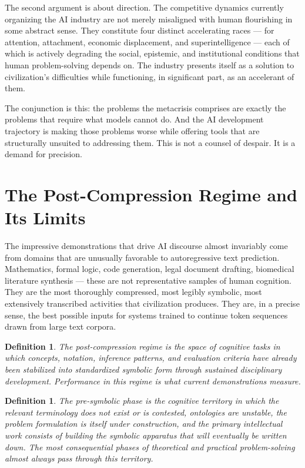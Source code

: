 \documentclass[12pt, a4paper]{article}
\newtheorem{definition}[theorem]{Definition}
\theoremstyle{remark}
\begin{document}
The second argument is about direction. The competitive dynamics currently organizing the AI industry are not merely misaligned with human flourishing in some abstract sense. They constitute four distinct accelerating races --- for attention, attachment, economic displacement, and superintelligence --- each of which is actively degrading the social, epistemic, and institutional conditions that human problem-solving depends on. The industry presents itself as a solution to civilization's difficulties while functioning, in significant part, as an accelerant of them.

The conjunction is this: the problems the metacrisis comprises are exactly the problems that require what models cannot do. And the AI development trajectory is making those problems worse while offering tools that are structurally unsuited to addressing them. This is not a counsel of despair. It is a demand for precision.

\section{The Post-Compression Regime and Its Limits}

The impressive demonstrations that drive AI discourse almost invariably come from domains that are unusually favorable to autoregressive text prediction. Mathematics, formal logic, code generation, legal document drafting, biomedical literature synthesis --- these are not representative samples of human cognition. They are the most thoroughly compressed, most legibly symbolic, most extensively transcribed activities that civilization produces. They are, in a precise sense, the best possible inputs for systems trained to continue token sequences drawn from large text corpora.

\begin{definition}
The \emph{post-compression regime} is the space of cognitive tasks in which concepts, notation, inference patterns, and evaluation criteria have already been stabilized into standardized symbolic form through sustained disciplinary development. Performance in this regime is what current demonstrations measure.
\end{definition}

\begin{definition}
The \emph{pre-symbolic phase} is the cognitive territory in which the relevant terminology does not exist or is contested, ontologies are unstable, the problem formulation is itself under construction, and the primary intellectual work consists of building the symbolic apparatus that will eventually be written down. The most consequential phases of theoretical and practical problem-solving almost always pass through this territory.
\end{definition}
\end{document}
